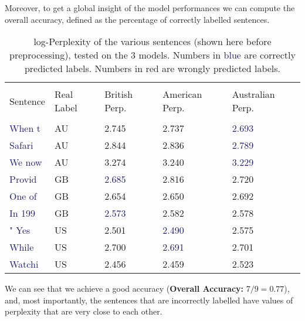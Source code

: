 \documentclass[
12pt,
a4paper,
oneside,
headinclude,
footinclude]{article}
\theoremstyle{definition} %
\begin{document}
Moreover, to get a global insight of the model performances we can compute the overall accuracy, defined as the percentage of correctly labelled sentences.


    \begin{table}[h]
    \centering %
    
    \begin{tabular}{l l l l l} %
        \hline
        \hline 
        \\[-1.5ex]
        \textcolor{BrickRed}{Sentence} & \textcolor{BrickRed}{Real Label} & \textcolor{BrickRed}{British Perp.} & \textcolor{BrickRed}{American Perp.} & \textcolor{BrickRed}{Australian Perp.}\\ [0.5ex]
        \hline %
        \\[-1.5ex]
        \textcolor{MidnightBlue}{When t} & AU & 2.745 & 2.737 & \textcolor{MidnightBlue}{2.693}\\ 
        \textcolor{MidnightBlue}{Safari} & AU & 2.844 & 2.836 & \textcolor{MidnightBlue}{2.789}\\
        \textcolor{MidnightBlue}{We now} & AU & 3.274 & 3.240 & \textcolor{MidnightBlue}{3.229}\\
        \textcolor{MidnightBlue}{Provid} & GB & \textcolor{MidnightBlue}{2.685} & 2.816 & 2.720\\
        \textcolor{MidnightBlue}{One of} & GB & 2.654 & \textcolor{BrickRed}{2.650} & 2.692\\
        \textcolor{MidnightBlue}{In 199} & GB & \textcolor{MidnightBlue}{2.573} & 2.582 & 2.578\\
        \textcolor{MidnightBlue}{" Yes } & US & 2.501 & \textcolor{MidnightBlue}{2.490} & 2.575\\
        \textcolor{MidnightBlue}{While } & US & 2.700 & \textcolor{MidnightBlue}{2.691} & 2.701\\
        \textcolor{MidnightBlue}{Watchi} & US & \textcolor{BrickRed}{2.456} & 2.459 & 2.523
        \\[1ex] %
        \hline %
        \end{tabular}
        \caption{\label{tab:table-perplexity}log-Perplexity of the various sentences (shown here before preprocessing), tested on the 3 models. Numbers in \textcolor{MidnightBlue}{blue} are correctly predicted labels. Numbers in \textcolor{BrickRed}{red} are wrongly predicted labels.}
    \end{table} 
We can see that we achieve a good accuracy (\textbf{Overall Accuracy: }$7/9 = 0.77$), and, most importantly, the sentences that are incorrectly labelled have values of perplexity that are very close to each other.
\end{document}
